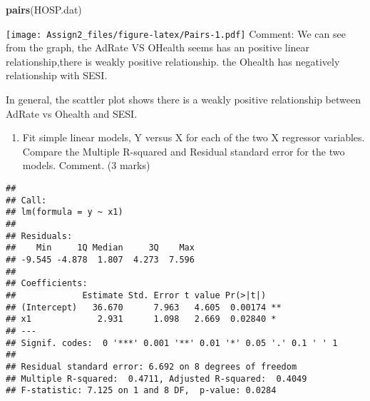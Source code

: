 \documentclass[11pt,]{article}
\newenvironment{Shaded}{\begin{snugshade}}{\end{snugshade}}
\newcommand{\KeywordTok}[1]{\textcolor[rgb]{0.13,0.29,0.53}{\textbf{#1}}}
\newcommand{\CommentTok}[1]{\textcolor[rgb]{0.56,0.35,0.01}{\textit{#1}}}
\newcommand{\OperatorTok}[1]{\textcolor[rgb]{0.81,0.36,0.00}{\textbf{#1}}}
\newcommand{\NormalTok}[1]{#1}
\providecommand{\tightlist}{%
  \setlength{\itemsep}{0pt}\setlength{\parskip}{0pt}}
\begin{document}
\begin{Shaded}
\begin{Highlighting}[]
\KeywordTok{pairs}\NormalTok{(HOSP.dat)}
\end{Highlighting}
\end{Shaded}

\texttt{[image: Assign2\_files/figure-latex/Pairs-1.pdf]} Comment: We can
see from the graph, the AdRate VS OHealth seems has an positive linear
relationship,there is weakly positive relationship. the Ohealth has
negatively relationship with SESI.

In general, the scattler plot shows there is a weakly positive
relationship between AdRate vs Ohealth and SESI.

\begin{enumerate}
\def\labelenumi{\arabic{enumi}.}
\setcounter{enumi}{2}
\tightlist
\item
  Fit simple linear models, Y versus X for each of the two X regressor
  variables. Compare the Multiple R-squared and Residual standard error
  for the two models. Comment. (3 marks)
\end{enumerate}

\begin{Shaded}
\end{Shaded}

\begin{verbatim}
## 
## Call:
## lm(formula = y ~ x1)
## 
## Residuals:
##    Min     1Q Median     3Q    Max 
## -9.545 -4.878  1.807  4.273  7.596 
## 
## Coefficients:
##             Estimate Std. Error t value Pr(>|t|)   
## (Intercept)   36.670      7.963   4.605  0.00174 **
## x1             2.931      1.098   2.669  0.02840 * 
## ---
## Signif. codes:  0 '***' 0.001 '**' 0.01 '*' 0.05 '.' 0.1 ' ' 1
## 
## Residual standard error: 6.692 on 8 degrees of freedom
## Multiple R-squared:  0.4711, Adjusted R-squared:  0.4049 
## F-statistic: 7.125 on 1 and 8 DF,  p-value: 0.0284
\end{verbatim}
\end{document}
